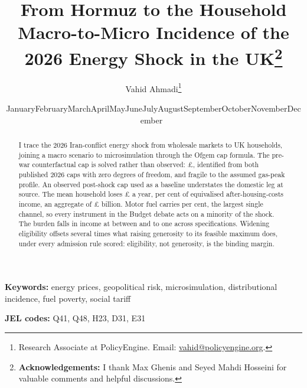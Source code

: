 \documentclass[11pt]{article}
\title{\bfseries From Hormuz to the Household\\[0.15cm] Macro-to-Micro Incidence of the 2026 Energy Shock in the UK\thanks{\textbf{Acknowledgements:} I thank Max Ghenis and Seyed Mahdi Hosseini for valuable comments and helpful discussions.}\\[0.7cm]}
\author{Vahid Ahmadi\thanks{Research Associate at PolicyEngine. Email: \href{mailto:vahid@policyengine.org}{vahid@policyengine.org}.}}
\date{\small \ifcase\month\or January\or February\or March\or April\or May\or June\or July\or August\or September\or October\or November\or December\fi\ \the\year}
\begin{document}
\maketitle

\begin{abstract}
\noindent I trace the 2026 Iran-conflict energy shock from wholesale markets to UK households, joining a macro scenario to microsimulation through the Ofgem cap formula. The pre-war counterfactual cap is solved rather than observed: \pounds \genCapBaselineLevel{}, identified from both published 2026 caps with zero degrees of freedom, and fragile to the assumed gas-peak profile. An observed post-shock cap used as a baseline understates the domestic leg at source. The mean household loses \pounds \genCentralLossMean{} a year, \genCentralLossPctIncome{} per cent of equivalised after-housing-costs income, an aggregate of \pounds \genAggSpendRealisedBn{} billion. Motor fuel carries \genMotorFuelShareOfLoss{} per cent, the largest single channel, so every instrument in the Budget debate acts on a minority of the shock. The burden falls in income at between \genSpecDecileRatioMin{} and \genSpecDecileRatioMax{} to one across specifications. Widening eligibility offsets several times what raising generosity to its feasible maximum does, under every admission rule scored: eligibility, not generosity, is the binding margin.
\end{abstract}

\medskip
\noindent\textbf{Keywords:} energy prices, geopolitical risk, microsimulation, distributional incidence, fuel poverty, social tariff

\medskip
\noindent\textbf{JEL codes:} Q41, Q48, H23, D31, E31

\newpage







\clearpage

\clearpage

\end{document}
